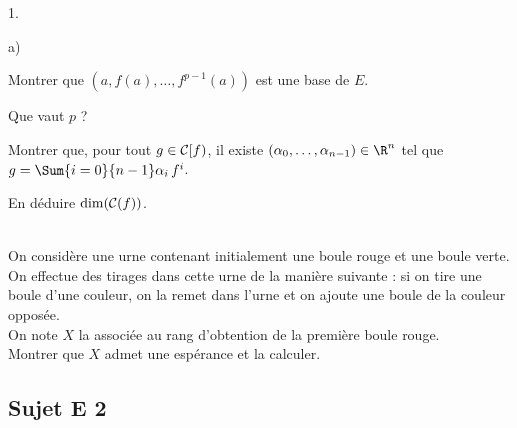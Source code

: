 \documentclass[11pt]{article}%
\begin{document}
\begin{exerciceAP}
\begin{noliste}{1.}
\begin{noliste}{a)}
    \item Montrer que $(a,f(a), \ldots, f^{p-1}(a))$ est une base de
      $E$.
      
    \item Que vaut $p$ ?
      
    \item Montrer que, pour tout $g \in {\cal C}[f)$, il existe
      $(\alpha_0, \ldots, \alpha_{n-1}) \in \R^{n}$ tel que $g =
      \Sum{i=0}{n-1} \alpha_i \, f^i$.
      
    \item En déduire $\dim({\cal C}(f))$.
    \end{noliste}
  \end{noliste}
\end{exerciceAP}



\begin{exerciceSP}~\\
  On considère une urne contenant initialement une boule rouge et une 
  boule verte.\\
  On effectue des tirages dans cette urne de la manière suivante : 
  si on tire une boule d'une couleur, on la remet dans l'urne et on 
  ajoute une boule de la couleur opposée.\\
  On note $X$ la \var associée au rang d'obtention de la première 
  boule rouge.\\
  Montrer que $X$ admet une espérance et la calculer.
\end{exerciceSP}




\newpage




\subsection*{Sujet E 2}
\end{document}
